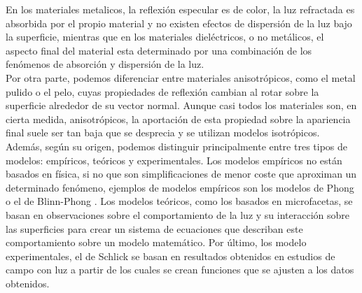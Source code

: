     En los materiales metalicos, la reflexi\'on especular es de color, la luz refractada es absorbida por el propio material
    y no existen efectos de dispersi\'on de la luz bajo la superficie, mientras que en los materiales diel\'ectricos, o no
    met\'alicos, el aspecto final del material esta determinado por una combinaci\'on de los fen\'omenos de absorci\'on y
    dispersi\'on de la luz.\\

    Por otra parte, podemos diferenciar entre materiales anisotr\'opicos, como el metal pulido o el pelo, cuyas propiedades
    de reflexi\'on cambian al rotar sobre la superficie alrededor de su vector normal. Aunque casi todos los materiales son, en cierta medida, anisotr\'opicos, la
    aportaci\'on de esta propiedad sobre la apariencia final suele ser tan baja que se desprecia y se utilizan modelos
    isotr\'opicos.\\

    Adem\'as, seg\'un su origen, podemos distinguir principalmente entre tres tipos de modelos: emp\'iricos, te\'oricos y
    experimentales. Los modelos emp\'iricos no est\'an basados en f\'isica, si no que son simplificaciones de menor coste que
    aproximan un determinado fen\'omeno, ejemplos de modelos emp\'iricos son los modelos de Phong \autocite{phong} o el
    de Blinn-Phong \autocite{blinnphong}. Los modelos te\'oricos, como los basados en microfacetas, se basan en observaciones sobre el comportamiento de la luz y su
    interacci\'on sobre las superficies para crear un sistema de ecuaciones que describan este comportamiento sobre un modelo
    matem\'atico. Por \'ultimo, los modelo experimentales, el de Schlick \autocite{schlick} se basan en resultados obtenidos en estudios de campo con luz a partir de los
    cuales se crean funciones que se ajusten a los datos obtenidos.

